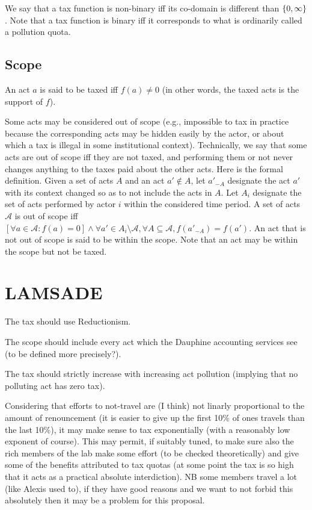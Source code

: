\documentclass[version=3.21, pagesize, twoside=off, bibliography=totoc, DIV=calc, fontsize=12pt, a4paper, french, english]{scrartcl}
\begin{document}
We say that a tax function is non-binary iff its co-domain is different than $\{0, \infty\}$. Note that a tax function is binary iff it corresponds to what is ordinarily called a pollution quota.

\subsection{Scope}
An act $a$ is said to be taxed iff $f(a) ≠ 0$ (in other words, the taxed acts is the support of $f$).

Some acts may be considered out of scope (e.g., impossible to tax in practice because the corresponding acts may be hidden easily by the actor, or about which a tax is illegal in some institutional context). Technically, we say that some acts are out of scope iff they are not taxed, and performing them or not never changes anything to the taxes paid about the other acts. Here is the formal definition. Given a set of acts $A$ and an act $a' \notin A$, let $a'_{-A}$ designate the act $a'$ with its context changed so as to not include the acts in $A$. Let $A_i$ designate the set of acts performed by actor $i$ within the considered time period. A set of acts $\mathcal{A}$ is out of scope iff $[\forall a \in \mathcal{A}: f(a) = 0] \land \forall a' \in A_i \setminus \mathcal{A}, \forall A \subseteq \mathcal{A}, f(a'_{-A}) = f(a')$.
An act that is not out of scope is said to be within the scope. Note that an act may be within the scope but not be taxed.

\section{LAMSADE}
The tax should use Reductionism.

The scope should include every act which the Dauphine accounting services see (to be defined more precisely?).

The tax should strictly increase with increasing act pollution (implying that no polluting act has zero tax).

Considering that efforts to not-travel are (I think) not linarly proportional to the amount of renouncement (it is easier to give up the first 10\% of ones travels than the last 10\%), it may make sense to tax exponentially (with a reasonably low exponent of course). This may permit, if suitably tuned, to make sure also the rich members of the lab make some effort (to be checked theoretically) and give some of the benefits attributed to tax quotas (at some point the tax is so high that it acts as a practical absolute interdiction). NB some members travel a lot (like Alexis used to), if they have good reasons and we want to not forbid this absolutely then it may be a problem for this proposal.
\end{document}
